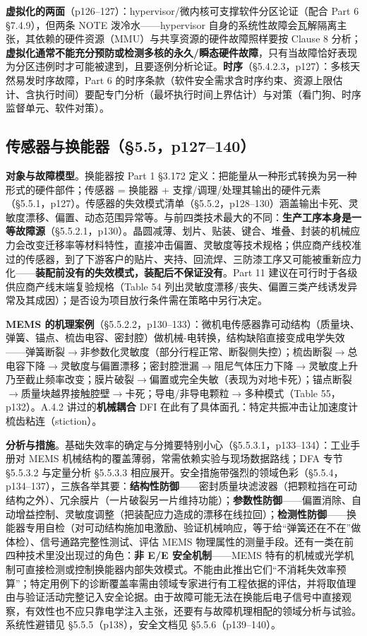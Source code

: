 \textbf{虚拟化的两面}（p126–127）：hypervisor/微内核可支撑软件分区论证（配合 Part 6 §7.4.9），但两条 NOTE 泼冷水——hypervisor 自身的系统性故障会瓦解隔离主张，其依赖的硬件资源（MMU）与共享资源的硬件故障照样要按 Clause 8 分析；\textbf{虚拟化通常不能充分预防或检测多核的永久/瞬态硬件故障}，只有当故障恰好表现为分区违例时才可能被逮到，且要逐例分析论证。\textbf{时序}（§5.4.2.3，p127）：多核天然易发时序故障，Part 6 的时序条款（软件安全需求含时序约束、资源上限估计、含执行时间）要配专门分析（最坏执行时间上界估计）与对策（看门狗、时序监督单元、软件对策）。

\subsection{传感器与换能器（§5.5，p127–140）}

\textbf{对象与故障模型}。换能器按 Part 1 §3.172 定义：把能量从一种形式转换为另一种形式的硬件部件；传感器 = 换能器 + 支撑/调理/处理其输出的硬件元素（§5.5.1，p127）。传感器的失效模式清单（§5.5.2，p128–130）涵盖输出卡死、灵敏度漂移、偏置、动态范围异常等。与前四类技术最大的不同：\textbf{生产工序本身是一等故障源}（§5.5.2.1，p130）。晶圆减薄、划片、贴装、键合、堆叠、封装的机械应力会改变迁移率等材料特性，直接冲击偏置、灵敏度等技术规格；供应商产线校准过的传感器，到了下游客户的贴片、夹持、回流焊、三防漆工序又可能被重新应力化——\textbf{装配前没有的失效模式，装配后不保证没有}。Part 11 建议在可行时于各级供应商产线末端复验规格（Table 54 列出灵敏度漂移/丧失、偏置三类产线诱发异常及其成因）；是否设为项目放行条件需在策略中另行决定。

\textbf{MEMS 的机理案例}（§5.5.2.2，p130–133）：微机电传感器靠可动结构（质量块、弹簧、锚点、梳齿电容、密封腔）做机械-电转换，结构缺陷直接变成电学失效——弹簧断裂\(\rightarrow\)非参数化灵敏度（部分行程正常、断裂侧失控）；梳齿断裂\(\rightarrow\)总电容下降\(\rightarrow\)灵敏度与偏置漂移；密封腔泄漏\(\rightarrow\)阻尼气体压力下降\(\rightarrow\)灵敏度上升乃至截止频率改变；膜片破裂\(\rightarrow\)偏置或完全失敏（表现为对地卡死）；锚点断裂\(\rightarrow\)质量块越界接触腔壁\(\rightarrow\)卡死；导电/非导电颗粒\(\rightarrow\)多种模式（Table 55，p132）。A.4.2 讲过的\textbf{机械耦合} DFI 在此有了具体面孔：特定共振冲击让加速度计梳齿粘连（stiction）。

\textbf{分析与措施}。基础失效率的确定与分摊要特别小心（§5.5.3.1，p133–134）：工业手册对 MEMS 机械结构的覆盖薄弱，常需依赖实验与现场数据路线；DFA 专节 §5.5.3.2 与定量分析 §5.5.3.3 相应展开。安全措施带强烈的领域色彩（§5.5.4，p134–137），三族各举其要：\textbf{结构性防御}——密封质量块滤波器（把颗粒挡在可动结构之外）、冗余膜片（一片破裂另一片维持功能）；\textbf{参数性防御}——偏置消除、自动增益控制、灵敏度调整（把装配应力造成的漂移在线拉回）；\textbf{检测性防御}——换能器专用自检（对可动结构施加电激励、验证机械响应，等于给“弹簧还在不在”做体检）、信号通路完整性测试、评估 MEMS 物理属性的测量手段。还有一类在前四种技术里没出现过的角色：\textbf{非 E/E 安全机制}——MEMS 特有的机械或光学机制可直接检测或控制换能器内部失效模式。不能由此推出它们“不消耗失效率预算”；特定用例下的诊断覆盖率需由领域专家进行有工程依据的评估，并将取值理由与验证活动完整记入安全论据。由于故障可能无法在换能后电子信号中直接观察，有效性也不应只靠电学注入主张，还要有与故障机理相配的领域分析与试验。系统性避错见 §5.5.5（p138），安全文档见 §5.5.6（p139–140）。

